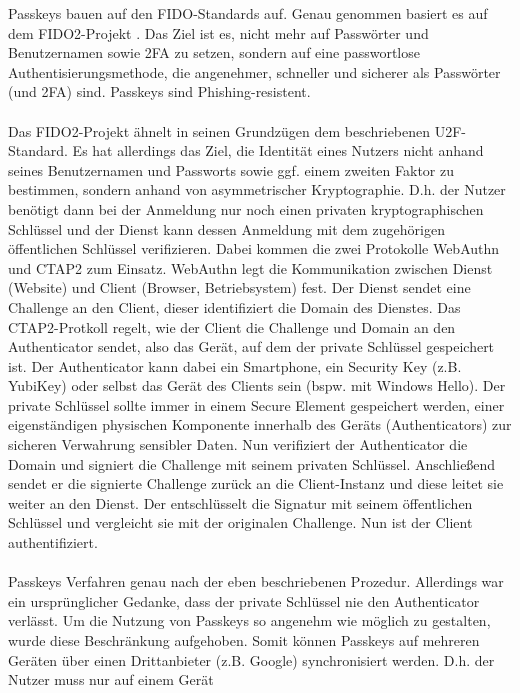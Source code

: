 Passkeys bauen auf den FIDO-Standards auf. Genau genommen basiert es 
auf dem FIDO2-Projekt \autocite{PkFIDO}. Das Ziel ist es, nicht mehr 
auf Passwörter und Benutzernamen sowie 2FA zu setzen, sondern auf eine 
passwortlose Authentisierungsmethode, die angenehmer, schneller und 
sicherer als Passwörter (und 2FA) sind. Passkeys sind 
Phishing-resistent.
\\\\
Das FIDO2-Projekt ähnelt in seinen Grundzügen dem beschriebenen 
U2F-Standard. Es hat allerdings das Ziel, die Identität eines Nutzers 
nicht anhand seines Benutzernamen und Passworts sowie ggf. einem 
zweiten Faktor zu bestimmen, sondern anhand von asymmetrischer 
Kryptographie. D.h. der Nutzer benötigt dann bei der Anmeldung nur noch 
einen privaten kryptographischen Schlüssel und der Dienst kann dessen 
Anmeldung mit dem zugehörigen öffentlichen Schlüssel verifizieren. 
Dabei kommen die zwei Protokolle WebAuthn \autocite{WebAuthnSpec} und 
CTAP2 \autocite{CTAPSpec} zum Einsatz. WebAuthn legt die Kommunikation 
zwischen Dienst (Website) und Client (Browser, Betriebsystem) fest. Der 
Dienst sendet eine Challenge an den Client, dieser identifiziert die 
Domain des Dienstes. Das CTAP2-Protkoll regelt, wie der Client die 
Challenge und Domain an den Authenticator sendet, also das Gerät, auf 
dem der private Schlüssel gespeichert ist. Der Authenticator kann dabei 
ein Smartphone, ein Security Key (z.B. YubiKey) oder selbst das Gerät 
des Clients sein (bspw. mit Windows Hello). Der private Schlüssel 
sollte immer in einem Secure Element \autocite{BSISecEl} gespeichert 
werden, einer eigenständigen physischen Komponente innerhalb des Geräts 
(Authenticators) zur sicheren Verwahrung sensibler Daten. Nun 
verifiziert der Authenticator die Domain und signiert die Challenge mit 
seinem privaten Schlüssel. Anschließend sendet er die signierte 
Challenge zurück an die Client-Instanz und diese leitet sie weiter an 
den Dienst. Der entschlüsselt die Signatur mit seinem öffentlichen 
Schlüssel und vergleicht sie mit der originalen Challenge. Nun ist der 
Client authentifiziert. \autocite{YubiFIDO2}
\\\\
Passkeys Verfahren genau nach der eben beschriebenen Prozedur. 
Allerdings war ein ursprünglicher Gedanke, dass der private Schlüssel 
nie den Authenticator verlässt. Um die Nutzung von Passkeys so angenehm 
wie möglich zu gestalten, wurde diese Beschränkung aufgehoben. Somit 
können Passkeys auf mehreren Geräten über einen Drittanbieter (z.B. 
Google) synchronisiert werden. D.h. der Nutzer muss nur auf einem Gerät 
